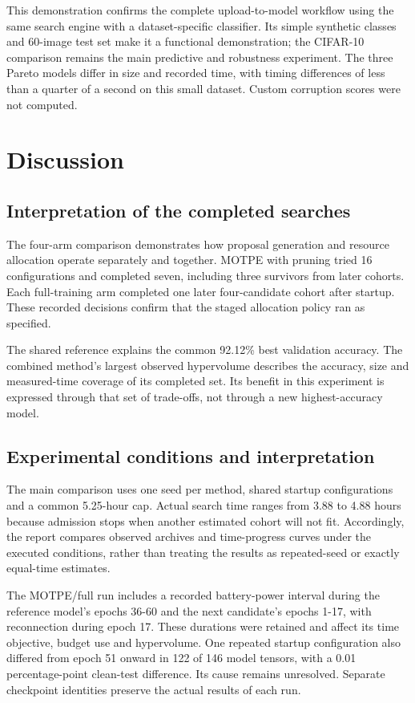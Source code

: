 \documentclass[11pt,a4paper,oneside]{report}
\begin{document}
This demonstration confirms the complete upload-to-model workflow using the same search engine with a dataset-specific classifier. Its simple synthetic classes and 60-image test set make it a functional demonstration; the CIFAR-10 comparison remains the main predictive and robustness experiment. The three Pareto models differ in size and recorded time, with timing differences of less than a quarter of a second on this small dataset. Custom corruption scores were not computed.
\chapter{Discussion}
\section{Interpretation of the completed searches}
The four-arm comparison demonstrates how proposal generation and resource allocation operate separately and together. MOTPE with pruning tried 16 configurations and completed seven, including three survivors from later cohorts. Each full-training arm completed one later four-candidate cohort after startup. These recorded decisions confirm that the staged allocation policy ran as specified.

The shared reference explains the common 92.12\% best validation accuracy. The combined method's largest observed hypervolume describes the accuracy, size and measured-time coverage of its completed set. Its benefit in this experiment is expressed through that set of trade-offs, not through a new highest-accuracy model.

\section{Experimental conditions and interpretation}
The main comparison uses one seed per method, shared startup configurations and a common 5.25-hour cap. Actual search time ranges from 3.88 to 4.88 hours because admission stops when another estimated cohort will not fit. Accordingly, the report compares observed archives and time-progress curves under the executed conditions, rather than treating the results as repeated-seed or exactly equal-time estimates.

The MOTPE/full run includes a recorded battery-power interval during the reference model's epochs 36-60 and the next candidate's epochs 1-17, with reconnection during epoch 17. These durations were retained and affect its time objective, budget use and hypervolume. One repeated startup configuration also differed from epoch 51 onward in 122 of 146 model tensors, with a 0.01 percentage-point clean-test difference. Its cause remains unresolved. Separate checkpoint identities preserve the actual results of each run.
\end{document}

